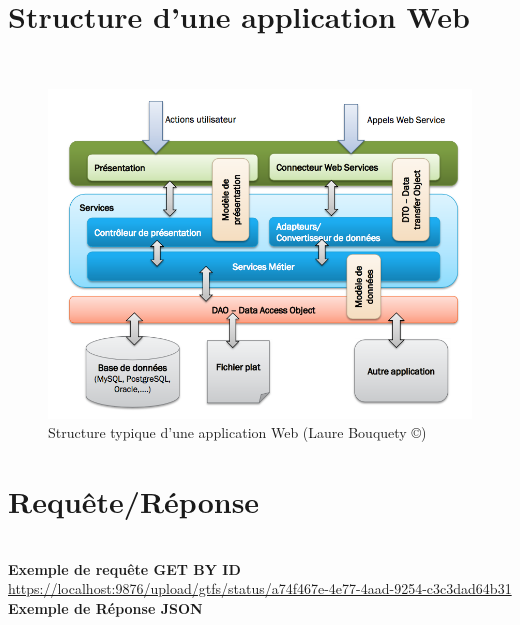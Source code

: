 \pagebreak

\section{Structure d'une application Web}\label{Annexe E}\\

\begin{figure}[!h]
\centering
\includegraphics[width=\textwidth]{images/WebAppArchitecture.png}
\caption{\label{WebAppArchitecture}Structure typique d'une application Web (Laure Bouquety \copyright)}
\end{figure} 

\pagebreak

\section{Requête/Réponse}\label{Annexe F}\\

\textbf{Exemple de requête \og GET BY ID \fg}\\

\url{https://localhost:9876/upload/gtfs/status/a74f467e-4e77-4aad-9254-c3c3dad64b31}\\
 
\textbf{Exemple de Réponse JSON}\\

